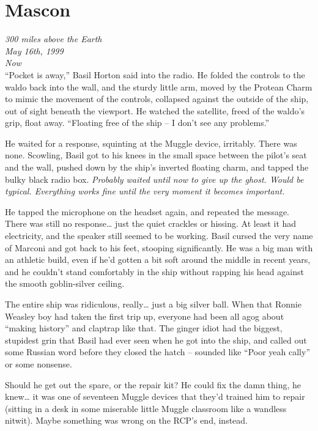 \hypertarget{mascon}{%
\chapter{Mascon}\label{mascon}}

\emph{300 miles above the Earth}\\
\emph{May 16th, 1999}\\
\emph{Now}\\

``Pocket is away,'' Basil Horton said into the radio. He folded the
controls to the waldo back into the wall, and the sturdy little arm,
moved by the Protean Charm to mimic the movement of the controls,
collapsed against the outside of the ship, out of sight beneath the
viewport. He watched the satellite, freed of the waldo's grip, float
away. ``Floating free of the ship -- I don't see any problems.''

He waited for a response, squinting at the Muggle device, irritably.
There was none. Scowling, Basil got to his knees in the small space
between the pilot's seat and the wall, pushed down by the ship's
inverted floating charm, and tapped the bulky black radio box.
\emph{Probably waited until now to give up the ghost. Would be typical.
Everything works fine until the very moment it becomes important.}

He tapped the microphone on the headset again, and repeated the message.
There was still no response\ldots{} just the quiet crackles or hissing.
At least it had electricity, and the speaker still seemed to be working.
Basil cursed the very name of Marconi and got back to his feet, stooping
significantly. He was a big man with an athletic build, even if he'd
gotten a bit soft around the middle in recent years, and he couldn't
stand comfortably in the ship without rapping his head against the
smooth goblin-silver ceiling.

The entire ship was ridiculous, really\ldots{} just a big silver ball.
When that Ronnie Weasley boy had taken the first trip up, everyone had
been all agog about ``making history'' and claptrap like that. The
ginger idiot had the biggest, stupidest grin that Basil had ever seen
when he got into the ship, and called out some Russian word before they
closed the hatch -- sounded like ``Poor yeah cally'' or some nonsense.

Should he get out the spare, or the repair kit? He could fix the damn
thing, he knew\ldots{} it was one of seventeen Muggle devices that
they'd trained him to repair (sitting in a desk in some miserable little
Muggle classroom like a wandless nitwit). Maybe something was wrong on
the RCP's end, instead.

